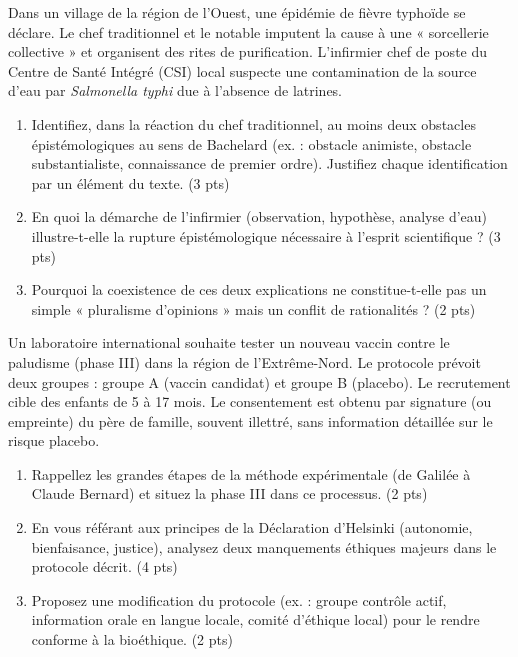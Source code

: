 \documentclass[11pt]{article}
\begin{document}
\begin{exercice}
Dans un village de la région de l'Ouest, une épidémie de fièvre typhoïde se déclare. Le chef traditionnel et le notable imputent la cause à une « sorcellerie collective » et organisent des rites de purification. L'infirmier chef de poste du Centre de Santé Intégré (CSI) local suspecte une contamination de la source d'eau par \textit{Salmonella typhi} due à l'absence de latrines.
\begin{enumerate}
    \item Identifiez, dans la réaction du chef traditionnel, au moins deux obstacles épistémologiques au sens de Bachelard (ex. : obstacle animiste, obstacle substantialiste, connaissance de premier ordre). Justifiez chaque identification par un élément du texte. (3 pts)
    \item En quoi la démarche de l'infirmier (observation, hypothèse, analyse d'eau) illustre-t-elle la rupture épistémologique nécessaire à l'esprit scientifique ? (3 pts)
    \item Pourquoi la coexistence de ces deux explications ne constitue-t-elle pas un simple « pluralisme d'opinions » mais un conflit de rationalités ? (2 pts)
\end{enumerate}
\end{exercice}

\begin{exercice}
Un laboratoire international souhaite tester un nouveau vaccin contre le paludisme (phase III) dans la région de l'Extrême-Nord. Le protocole prévoit deux groupes : groupe A (vaccin candidat) et groupe B (placebo). Le recrutement cible des enfants de 5 à 17 mois. Le consentement est obtenu par signature (ou empreinte) du père de famille, souvent illettré, sans information détaillée sur le risque placebo.
\begin{enumerate}
    \item Rappellez les grandes étapes de la méthode expérimentale (de Galilée à Claude Bernard) et situez la phase III dans ce processus. (2 pts)
    \item En vous référant aux principes de la Déclaration d'Helsinki (autonomie, bienfaisance, justice), analysez deux manquements éthiques majeurs dans le protocole décrit. (4 pts)
    \item Proposez une modification du protocole (ex. : groupe contrôle actif, information orale en langue locale, comité d'éthique local) pour le rendre conforme à la bioéthique. (2 pts)
\end{enumerate}
\end{exercice}
\end{document}
